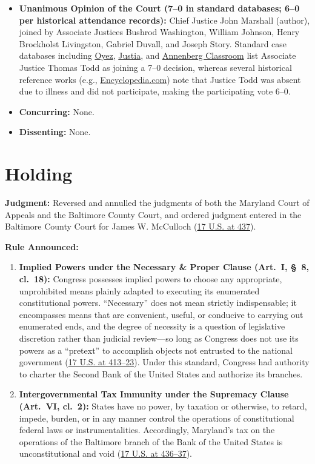 \documentclass[12pt]{article}
\begin{document}
\begin{itemize}
    \item \textbf{Unanimous Opinion of the Court (7--0 in standard databases; 6--0 per historical attendance records):} Chief Justice John Marshall (author), joined by Associate Justices Bushrod Washington, William Johnson, Henry Brockholst Livingston, Gabriel Duvall, and Joseph Story. Standard case databases including \href{https://www.oyez.org/cases/1789-1850/17us316}{Oyez}, \href{https://supreme.justia.com/cases/federal/us/17/316/}{Justia}, and \href{https://www.annenbergclassroom.org/resource/the-pursuit-of-justice/pursuit-justice-chapter-2-national-bank-federalism/}{Annenberg Classroom} list Associate Justice Thomas Todd as joining a 7--0 decision, whereas several historical reference works (e.g., \href{https://www.encyclopedia.com/law/legal-and-political-magazines/mcculloch-v-maryland-1819}{Encyclopedia.com}) note that Justice Todd was absent due to illness and did not participate, making the participating vote 6--0.
    \item \textbf{Concurring:} None.
    \item \textbf{Dissenting:} None.
\end{itemize}

\section{Holding}

\textbf{Judgment:} Reversed and annulled the judgments of both the Maryland Court of Appeals and the Baltimore County Court, and ordered judgment entered in the Baltimore County Court for James W. McCulloch (\href{https://supreme.justia.com/cases/federal/us/17/316/}{17 U.S. at 437}).

\textbf{Rule Announced:}
\begin{enumerate}
    \item \textbf{Implied Powers under the Necessary \& Proper Clause (Art.\ I, \S~8, cl.\ 18):} Congress possesses implied powers to choose any appropriate, unprohibited means plainly adapted to executing its enumerated constitutional powers. ``Necessary'' does not mean strictly indispensable; it encompasses means that are convenient, useful, or conducive to carrying out enumerated ends, and the degree of necessity is a question of legislative discretion rather than judicial review---so long as Congress does not use its powers as a ``pretext'' to accomplish objects not entrusted to the national government (\href{https://supreme.justia.com/cases/federal/us/17/316/}{17 U.S. at 413--23}). Under this standard, Congress had authority to charter the Second Bank of the United States and authorize its branches.
    \item \textbf{Intergovernmental Tax Immunity under the Supremacy Clause (Art.\ VI, cl.\ 2):} States have no power, by taxation or otherwise, to retard, impede, burden, or in any manner control the operations of constitutional federal laws or instrumentalities. Accordingly, Maryland's tax on the operations of the Baltimore branch of the Bank of the United States is unconstitutional and void (\href{https://supreme.justia.com/cases/federal/us/17/316/}{17 U.S. at 436--37}).
\end{enumerate}
\end{document}
